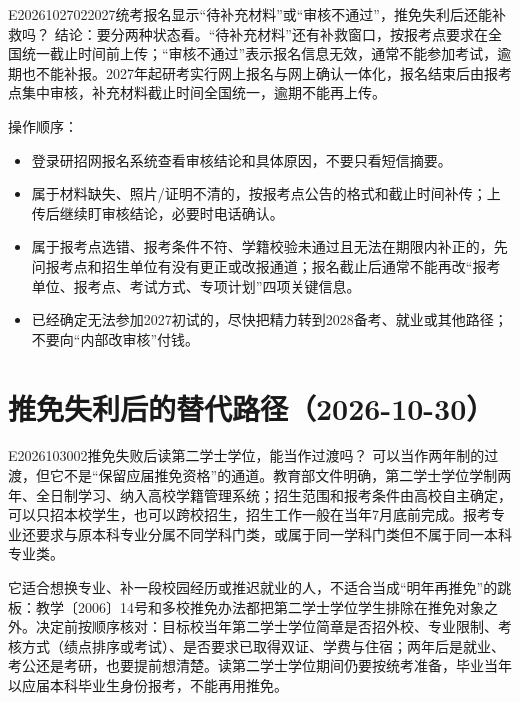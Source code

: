 \begin{qa}{E2026102702}{2027统考报名显示“待补充材料”或“审核不通过”，推免失利后还能补救吗？}
结论：要分两种状态看。“待补充材料”还有补救窗口，按报考点要求在全国统一截止时间前上传；“审核不通过”表示报名信息无效，通常不能参加考试，逾期也不能补报。2027年起研考实行网上报名与网上确认一体化，报名结束后由报考点集中审核，补充材料截止时间全国统一，逾期不能再上传。

操作顺序：
\begin{itemize}
  \item 登录研招网报名系统查看审核结论和具体原因，不要只看短信摘要。
  \item 属于材料缺失、照片/证明不清的，按报考点公告的格式和截止时间补传；上传后继续盯审核结论，必要时电话确认。
  \item 属于报考点选错、报考条件不符、学籍校验未通过且无法在期限内补正的，先问报考点和招生单位有没有更正或改报通道；报名截止后通常不能再改“报考单位、报考点、考试方式、专项计划”四项关键信息。
  \item 已经确定无法参加2027初试的，尽快把精力转到2028备考、就业或其他路径；不要向“内部改审核”付钱。
\end{itemize}
\end{qa}

\section{推免失利后的替代路径（2026-10-30）}

\begin{qa}{E2026103002}{推免失败后读第二学士学位，能当作过渡吗？}
可以当作两年制的过渡，但它不是“保留应届推免资格”的通道。教育部文件明确，第二学士学位学制两年、全日制学习、纳入高校学籍管理系统；招生范围和报考条件由高校自主确定，可以只招本校学生，也可以跨校招生，招生工作一般在当年7月底前完成。报考专业还要求与原本科专业分属不同学科门类，或属于同一学科门类但不属于同一本科专业类。

它适合想换专业、补一段校园经历或推迟就业的人，不适合当成“明年再推免”的跳板：教学〔2006〕14号和多校推免办法都把第二学士学位学生排除在推免对象之外。决定前按顺序核对：目标校当年第二学士学位简章是否招外校、专业限制、考核方式（绩点排序或考试）、是否要求已取得双证、学费与住宿；两年后是就业、考公还是考研，也要提前想清楚。读第二学士学位期间仍要按统考准备，毕业当年以应届本科毕业生身份报考，不能再用推免。
\end{qa}

